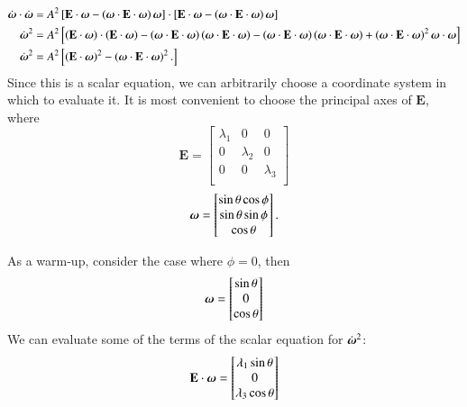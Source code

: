 \documentclass[preprint,12pt,authoryear]{elsarticle}
\newcommand{\mitbf}[1]{\hbox{\mathversion{bold}$#1$}}
\begin{document}
\begin{equation}
\begin{aligned}
\dot{\mitbf{\omega}} \cdot \dot{\mitbf{\omega}} &= 
A^2 \left[ \mathbf{E}\cdot \mitbf{\omega} - \left(\mitbf{\omega} \cdot \mathbf{E} \cdot \mitbf{\omega} \right)\mitbf{\omega}\right]
\cdot \left[ \mathbf{E}\cdot \mitbf{\omega} - \left(\mitbf{\omega} \cdot \mathbf{E} \cdot \mitbf{\omega} \right)\mitbf{\omega}\right] \\
\dot{\mitbf{\omega}}^2  &= 
A^2 \left[ \left(\mathbf{E}\cdot \mitbf{\omega}\right)\cdot \left(\mathbf{E}\cdot \mitbf{\omega}\right)
 - \left(\mitbf{\omega} \cdot \mathbf{E} \cdot \mitbf{\omega} \right) \left( \mitbf{\omega}\cdot \mathbf{E} \cdot \mitbf{\omega} \right) 
 - \left(\mitbf{\omega} \cdot \mathbf{E} \cdot \mitbf{\omega} \right) \left( \mitbf{\omega}\cdot \mathbf{E} \cdot \mitbf{\omega} \right) 
 + \left(\mitbf{\omega} \cdot \mathbf{E} \cdot \mitbf{\omega} \right)^2 \mitbf{\omega}\cdot \mitbf{\omega} 
\right]\\
\dot{\mitbf{\omega}}^2  &= 
A^2 \left[ \left(\mathbf{E}\cdot \mitbf{\omega}\right)^2
 - \left(\mitbf{\omega} \cdot \mathbf{E} \cdot \mitbf{\omega} \right)^2.
\right]\\
\end{aligned}
\end{equation}
Since this is a scalar equation, we can arbitrarily choose a coordinate system in which to evaluate it.
It is most convenient to choose the principal axes of $\mathbf{E}$, where
\begin{equation}
\mathbf{E} = 
\begin{bmatrix}
\lambda_1 & 0 & 0 \\
0 & \lambda_2 & 0 \\
0 & 0 & \lambda_3 \\
\end{bmatrix}
\end{equation}
\begin{equation}
\mitbf{\omega} = 
\begin{bmatrix}
\sin{\theta} \cos{\phi} \\
\sin{\theta} \sin{\phi} \\
\cos{\theta} \\
\end{bmatrix}.
\end{equation}

As a warm-up, consider the case where $\phi = 0$, then  
\begin{equation}
\mitbf{\omega} = 
\begin{bmatrix}
\sin{\theta}  \\
0 \\
\cos{\theta} \\
\end{bmatrix}
\end{equation}
We can evaluate some of the terms of the scalar equation for $\dot{\mitbf{\omega}}^2$:
\begin{equation}
\mathbf{E}\cdot \mitbf{\omega} = 
\begin{bmatrix}
\lambda_1 \sin{\theta} \\
0 \\
\lambda_3 \cos{\theta}
\end{bmatrix}
\end{equation}
\end{document}
